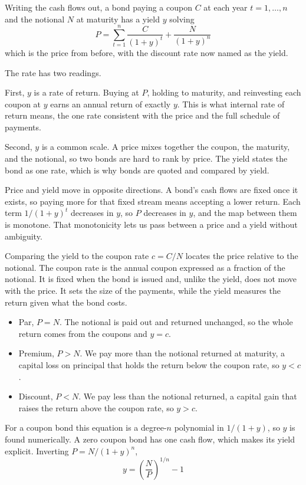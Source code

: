 Writing the cash flows out, a bond paying a coupon $C$ at each year $t = 1, \dots, n$ and the notional $N$ at maturity has a yield $y$ solving
\[
P = \sum_{t=1}^{n} \frac{C}{(1+y)^t} + \frac{N}{(1+y)^n}
\]
which is the price from before, with the discount rate now named as the yield.

The rate has two readings.

First, $y$ is a rate of return. Buying at $P$, holding to maturity, and reinvesting each coupon at $y$ earns an annual return of exactly $y$. This is what internal rate of return means, the one rate consistent with the price and the full schedule of payments.

Second, $y$ is a common scale. A price mixes together the coupon, the maturity, and the notional, so two bonds are hard to rank by price. The yield states the bond as one rate, which is why bonds are quoted and compared by yield.

Price and yield move in opposite directions. A bond's cash flows are fixed once it exists, so paying more for that fixed stream means accepting a lower return. Each term $1/(1+y)^t$ decreases in $y$, so $P$ decreases in $y$, and the map between them is monotone. That monotonicity lets us pass between a price and a yield without ambiguity.

Comparing the yield to the coupon rate $c = C/N$ locates the price relative to the notional. The coupon rate is the annual coupon expressed as a fraction of the notional. It is fixed when the bond is issued and, unlike the yield, does not move with the price. It sets the size of the payments, while the yield measures the return given what the bond costs.
\begin{itemize}[label=--, itemsep=0.3em]
    \item Par, $P = N$. The notional is paid out and returned unchanged, so the whole return comes from the coupons and $y = c$.
    \item Premium, $P > N$. We pay more than the notional returned at maturity, a capital loss on principal that holds the return below the coupon rate, so $y < c$.
    \item Discount, $P < N$. We pay less than the notional returned, a capital gain that raises the return above the coupon rate, so $y > c$.
\end{itemize}

For a coupon bond this equation is a degree-$n$ polynomial in $1/(1+y)$, so $y$ is found numerically. A zero coupon bond has one cash flow, which makes its yield explicit. Inverting $P = N/(1+y)^n$,
\[
y = \left(\frac{N}{P}\right)^{1/n} - 1
\]

